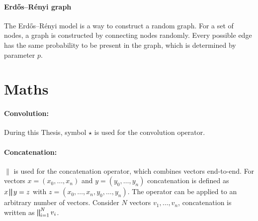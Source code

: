\paragraph{Erdős–Rényi graph}
The Erdős–Rényi model is a way to construct a random graph.
For a set of nodes, a graph is constructed by connecting nodes randomly. 
Every possible edge has the same probability to be present in the graph, which is determined by parameter $p$.
 
\section{Maths}
\paragraph{Convolution:}
During this Thesis, symbol $\star$ is used for the convolution operator.

\paragraph{Concatenation:}
$\parallel$ is used for the concatenation operator, which combines vectors end-to-end. 
For vectors $x=(x_0, \dots, x_n)$ and $y=(y_0, \dots, y_n)$ concatenation is defined as 
$ x \bigparallel y = z$ with $z=(x_0, \dots, x_n, y_0, \dots, y_n) $. 
The operator can be applied to an arbitrary number of vectors.
Consider $N$ vectors $v_1, \dots, v_n$, concatenation is written as  $\bigparallel^N_{i=1} v_i$.

